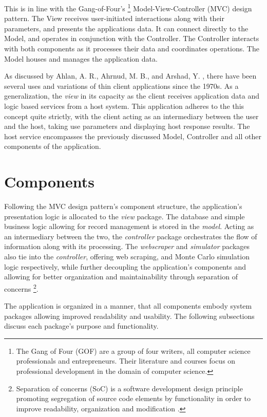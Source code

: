 \documentclass{thesis-ekf}
\theoremstyle{definition}
\theoremstyle{remark}
\begin{document}
This is in line with the Gang-of-Four's \footnote{The Gang of Four \cite{GOF2} (GOF) are a group of four writers, all computer science professionals and entrepreneurs. Their literature and courses focus on professional development in the domain of computer science.} Model-View-Controller (MVC) \cite[p.~529]{GOF} design pattern. The View receives user-initiated interactions along with their parameters, and presents the applications data. It can connect directly to the Model, and operates in conjunction with the Controller. The Controller interacts with both components as it processes their data and coordinates operations. The Model houses and manages the application data.

As discussed by Ahlan, A. R., Ahrnud, M. B., and Arshad, Y. \cite{Kulliyyah}, there have been several uses and variations of thin client applications since the 1970s. As a generalization, the \emph{view} in its capacity as the client receives application data and logic based services from a host system. This application adheres to the this concept quite strictly, with the client acting as an intermediary between the user and the host, taking use parameters and displaying host response results. The host service encompasses the previously discussed Model, Controller and all other components of the application.


\section{Components}
Following the MVC design pattern's component structure, the application's presentation logic is allocated to the \emph{view} package. The database and simple business logic allowing for record management is stored in the \emph{model}. Acting as an intermediary between the two, the \emph{controller} package orchestrates the flow of information along with its processing. The \emph{webscraper} and \emph{simulator} packages also tie into the \emph{controller}, offering web scraping, and Monte Carlo simulation logic respectively, while further decoupling the application's components and allowing for better organization and maintainability through separation of concerns \footnote{Separation of concerns (SoC) is a software development design principle promoting segregation of source code elements by functionality in order to improve readability, organization and modification \cite{Reade}.}.

The application is organized in a manner, that all components embody system packages allowing improved readability and usability. The following subsections discuss each package's purpose and functionality.
\end{document}

